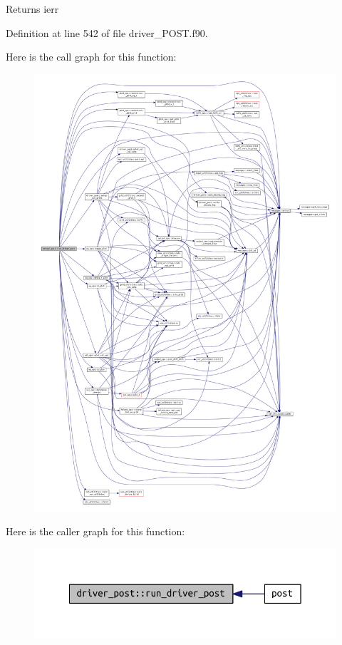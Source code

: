 \begin{DoxyReturn}{Returns}
ierr 
\end{DoxyReturn}


Definition at line 542 of file driver\+\_\+\+P\+O\+S\+T.\+f90.

Here is the call graph for this function\+:
\nopagebreak
\begin{figure}[H]
\begin{center}
\leavevmode
\includegraphics[width=350pt]{namespacedriver__post_a33b3c6f9018a0ddc92dce77394b8ab37_cgraph}
\end{center}
\end{figure}
Here is the caller graph for this function\+:\nopagebreak
\begin{figure}[H]
\begin{center}
\leavevmode
\includegraphics[width=342pt]{namespacedriver__post_a33b3c6f9018a0ddc92dce77394b8ab37_icgraph}
\end{center}
\end{figure}
\mbox{\label{namespacedriver__post_a3438685c5fb7302f756c368fb5f940ee}} 
